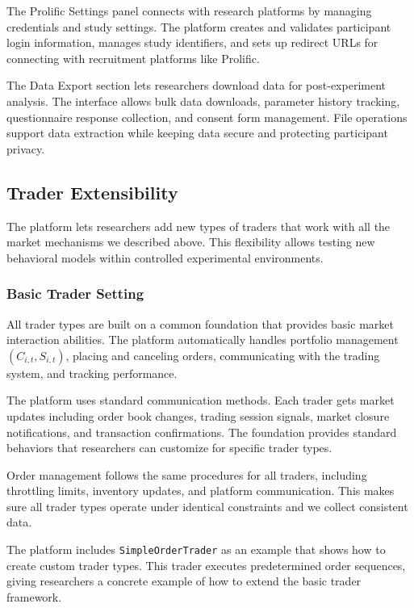 The Prolific Settings panel connects with research platforms by managing credentials and study settings. The platform creates and validates participant login information, manages study identifiers, and sets up redirect URLs for connecting with recruitment platforms like Prolific.

The Data Export section lets researchers download data for post-experiment analysis. The interface allows bulk data downloads, parameter history tracking, questionnaire response collection, and consent form management. File operations support data extraction while keeping data secure and protecting participant privacy.

\subsection{Trader Extensibility}
\label{sec:extensibility}

The platform lets researchers add new types of traders that work with all the market mechanisms we described above. This flexibility allows testing new behavioral models within controlled experimental environments.

\subsubsection{Basic Trader Setting}

All trader types are built on a common foundation that provides basic market interaction abilities. The platform automatically handles portfolio management $(C_{i,t}, S_{i,t})$, placing and canceling orders, communicating with the trading system, and tracking performance.

The platform uses standard communication methods. Each trader gets market updates including order book changes, trading session signals, market closure notifications, and transaction confirmations. The foundation provides standard behaviors that researchers can customize for specific trader types.

Order management follows the same procedures for all traders, including throttling limits, inventory updates, and platform communication. This makes sure all trader types operate under identical constraints and we collect consistent data.

The platform includes \texttt{SimpleOrderTrader} as an example that shows how to create custom trader types. This trader executes predetermined order sequences, giving researchers a concrete example of how to extend the basic trader framework.

